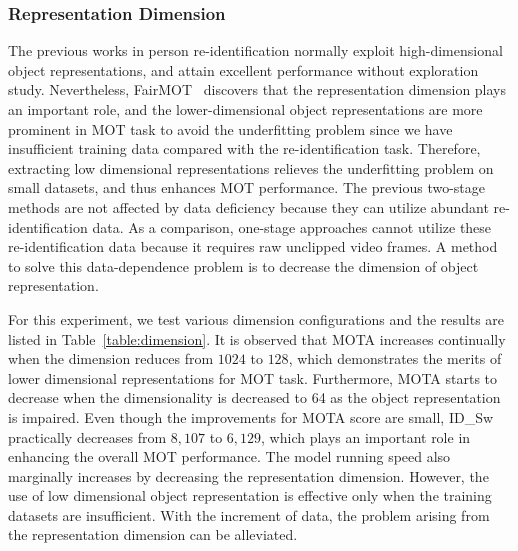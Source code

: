\documentclass[acmsmall]{acmart}
\begin{document}
\subsubsection{{Representation Dimension}} \label{sec:dimension}
The previous works in person re-identification normally exploit high-dimensional object representations, 
and attain excellent performance without exploration study. 
Nevertheless, FairMOT~\cite{fairmot} discovers that the representation dimension plays an important role, 
and the lower-dimensional object representations are more prominent in MOT task to avoid the underfitting problem since we have insufficient training data compared with the re-identification task. 
Therefore, extracting low dimensional representations relieves the underfitting problem on small datasets, 
and thus enhances MOT performance. 
The previous two-stage methods are not affected by data deficiency because they can utilize abundant re-identification data.
As a comparison, one-stage approaches cannot utilize these re-identification data because it requires raw unclipped video frames. 
A method to solve this data-dependence problem is to decrease the dimension of object representation. 

For this experiment, we test various dimension configurations and the results are listed in Table~\ref{table:dimension}. 
It is observed that MOTA increases continually when the dimension reduces from $1024$ to $128$, which demonstrates the merits of lower dimensional representations for MOT task. 
Furthermore, MOTA starts to decrease when the dimensionality is decreased to 64 as the object representation is impaired.
Even though the improvements for MOTA score are small, ID\_Sw practically decreases from $8,107$ to $6,129$, 
which plays an important role in enhancing the overall MOT performance. 
The model running speed also marginally increases by decreasing the representation dimension. 
However, the use of low dimensional object representation is effective only when the training datasets are insufficient. 
With the increment of data, the problem arising from the representation dimension can be alleviated. 
\end{document}
